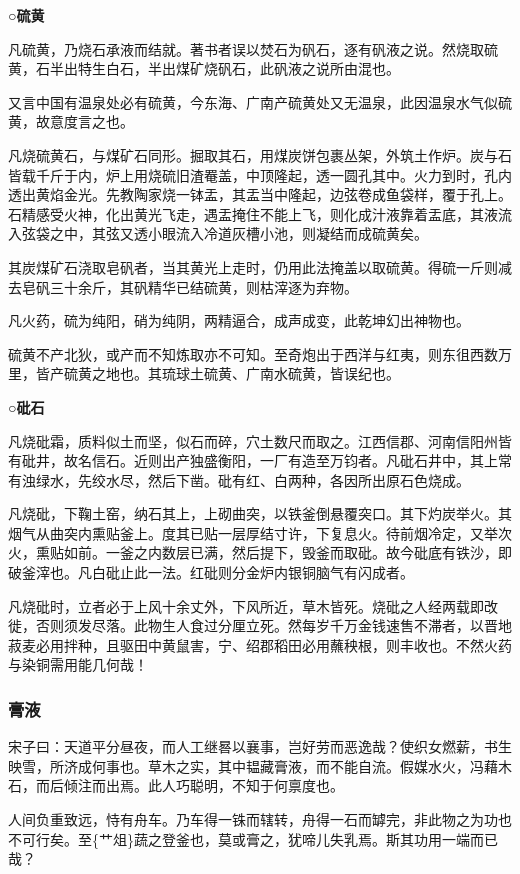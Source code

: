 \documentclass[]{article}
\begin{document}
\textbf{○硫黄}

凡硫黄，乃烧石承液而结就。著书者误以焚石为矾石，逐有矾液之说。然烧取硫黄，石半出特生白石，半出煤矿烧矾石，此矾液之说所由混也。

又言中国有温泉处必有硫黄，今东海、广南产硫黄处又无温泉，此因温泉水气似硫黄，故意度言之也。

凡烧硫黄石，与煤矿石同形。掘取其石，用煤炭饼包裹丛架，外筑土作炉。炭与石皆载千斤于内，炉上用烧硫旧渣罨盖，中顶隆起，透一圆孔其中。火力到时，孔内透出黄焰金光。先教陶家烧一钵盂，其盂当中隆起，边弦卷成鱼袋样，覆于孔上。石精感受火神，化出黄光飞走，遇盂掩住不能上飞，则化成汁液靠着盂底，其液流入弦袋之中，其弦又透小眼流入冷道灰槽小池，则凝结而成硫黄矣。

其炭煤矿石浇取皂矾者，当其黄光上走时，仍用此法掩盖以取硫黄。得硫一斤则减去皂矾三十余斤，其矾精华已结硫黄，则枯滓逐为弃物。

凡火药，硫为纯阳，硝为纯阴，两精逼合，成声成变，此乾坤幻出神物也。

硫黄不产北狄，或产而不知炼取亦不可知。至奇炮出于西洋与红夷，则东徂西数万里，皆产硫黄之地也。其琉球土硫黄、广南水硫黄，皆误纪也。

\textbf{○砒石}

凡烧砒霜，质料似土而坚，似石而碎，穴土数尺而取之。江西信郡、河南信阳州皆有砒井，故名信石。近则出产独盛衡阳，一厂有造至万钧者。凡砒石井中，其上常有浊绿水，先绞水尽，然后下凿。砒有红、白两种，各因所出原石色烧成。

凡烧砒，下鞠土窑，纳石其上，上砌曲突，以铁釜倒悬覆突口。其下灼炭举火。其烟气从曲突内熏贴釜上。度其已贴一层厚结寸许，下复息火。待前烟冷定，又举次火，熏贴如前。一釜之内数层已满，然后提下，毁釜而取砒。故今砒底有铁沙，即破釜滓也。凡白砒止此一法。红砒则分金炉内银铜脑气有闪成者。

凡烧砒时，立者必于上风十余丈外，下风所近，草木皆死。烧砒之人经两载即改徙，否则须发尽落。此物生人食过分厘立死。然每岁千万金钱速售不滞者，以晋地菽麦必用拌种，且驱田中黄鼠害，宁、绍郡稻田必用蘸秧根，则丰收也。不然火药与染铜需用能几何哉！

\hypertarget{header-n2619}{%
\subsubsection{膏液}\label{header-n2619}}

宋子曰：天道平分昼夜，而人工继晷以襄事，岂好劳而恶逸哉？使织女燃薪，书生映雪，所济成何事也。草木之实，其中韫藏膏液，而不能自流。假媒水火，冯藉木石，而后倾注而出焉。此人巧聪明，不知于何禀度也。

人间负重致远，恃有舟车。乃车得一铢而辖转，舟得一石而罅完，非此物之为功也不可行矣。至\{艹俎\}蔬之登釜也，莫或膏之，犹啼儿失乳焉。斯其功用一端而已哉？
\end{document}
